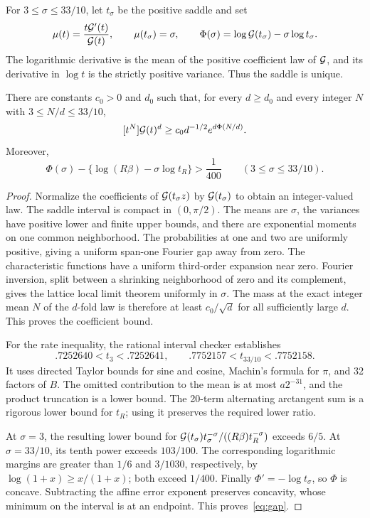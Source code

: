 \documentclass[11pt,a4paper]{article}
\theoremstyle{remark}\newtheorem*{ednote}{Editorial note (ProveIt, 2026-10-01)}
\begin{document}
For $3\le\sigma\le33/10$, let $t_\sigma$ be the positive saddle and set
\[
 \mu(t)=\frac{t\mathcal G'(t)}{\mathcal G(t)},\qquad
 \mu(t_\sigma)=\sigma,\qquad
 \Phi(\sigma)=\log\mathcal G(t_\sigma)-\sigma\log t_\sigma.
\]
The logarithmic derivative is the mean of the positive coefficient law of $\mathcal G$, and its derivative in $\log t$ is the strictly positive variance. Thus the saddle is unique.
\begin{lemma}\label{lem:uniform}
There are constants $c_0>0$ and $d_0$ such that, for every $d\ge d_0$ and every integer $N$ with $3\le N/d\le33/10$,
\[
 [t^N]\mathcal G(t)^d\ge c_0d^{-1/2}e^{d\Phi(N/d)}.
\]
Moreover,
\begin{equation}\label{eq:gap}
 \Phi(\sigma)-\{\log(R\beta)-\sigma\log t_R\}>\frac1{400}
 \qquad(3\le\sigma\le33/10).
\end{equation}
\end{lemma}
\begin{proof}
Normalize the coefficients of $\mathcal G(t_\sigma z)$ by $\mathcal G(t_\sigma)$ to obtain an integer-valued law. The saddle interval is compact in $(0,\pi/2)$. The means are $\sigma$, the variances have positive lower and finite upper bounds, and there are exponential moments on one common neighborhood. The probabilities at one and two are uniformly positive, giving a uniform span-one Fourier gap away from zero. The characteristic functions have a uniform third-order expansion near zero. Fourier inversion, split between a shrinking neighborhood of zero and its complement, gives the lattice local limit theorem uniformly in $\sigma$. The mass at the exact integer mean $N$ of the $d$-fold law is therefore at least $c_0/\sqrt d$ for all sufficiently large $d$. This proves the coefficient bound.

For the rate inequality, the rational interval checker establishes
\[
 .7252640<t_3<.7252641,\qquad
 .7752157<t_{33/10}<.7752158.
\]
It uses directed Taylor bounds for sine and cosine, Machin's formula for $\pi$, and 32 factors of $B$. The omitted contribution to the mean is at most $a2^{-31}$, and the product truncation is a lower bound. The 20-term alternating arctangent sum is a rigorous lower bound for $t_R$; using it preserves the required lower ratio.

At $\sigma=3$, the resulting lower bound for
$\mathcal G(t_\sigma)t_\sigma^{-\sigma}/((R\beta)t_R^{-\sigma})$ exceeds $6/5$. At $\sigma=33/10$, its tenth power exceeds $103/100$. The corresponding logarithmic margins are greater than $1/6$ and $3/1030$, respectively, by $\log(1+x)\ge x/(1+x)$; both exceed $1/400$.
Finally $\Phi'=-\log t_\sigma$, so $\Phi$ is concave. Subtracting the affine error exponent preserves concavity, whose minimum on the interval is at an endpoint. This proves~\eqref{eq:gap}.
\end{proof}
\end{document}

